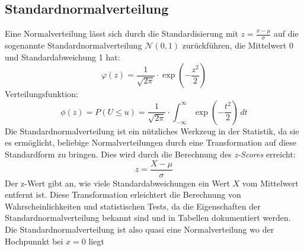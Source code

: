 \subsection{Standardnormalverteilung}
\label{sec:standard_normal_distribution}

Eine Normalverteilung lässt sich durch die Standardisierung mit $z = \frac{x - \mu}{\sigma}$ auf die sogenannte Standardnormalverteilung $\mathcal{N}(0, 1)$ zurückführen, die Mittelwert 0 und Standardabweichung 1 hat:
\[
\varphi(z) = \frac{1}{\sqrt{2 \pi}} \cdot \exp\left(-\frac{z^2}{2}\right)
\]
Verteilungsfunktion:
\[
\phi(z) = P(U \leq u) = \frac{1}{\sqrt{2 \pi}} \cdot \int_{-\infty}^{\infty} \exp\left(-\frac{t^2}{2}\right)\, dt
\]
Die Standardnormalverteilung ist ein nützliches Werkzeug in der Statistik, da sie es ermöglicht, beliebige Normalverteilungen durch eine Transformation auf diese Standardform zu bringen. Dies wird durch die Berechnung des \textit{z-Scores} erreicht:
\[
z = \frac{X - \mu}{\sigma}
\]
Der z-Wert gibt an, wie viele Standardabweichungen ein Wert \(X\) vom Mittelwert entfernt ist. Diese Transformation erleichtert die Berechnung von Wahrscheinlichkeiten und statistischen Tests, da die Eigenschaften der Standardnormalverteilung bekannt sind und in Tabellen dokumentiert werden.
Die Standardnormalverteilung ist also quasi eine Normalverteilung wo der Hochpunnkt bei $x=0$ liegt


